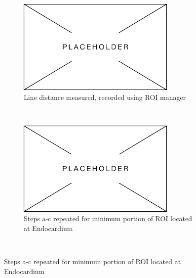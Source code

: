 \begin{figure}[H]
    \begin{subfigure}[c]{0.475\textwidth}
    \centering
    \includegraphics[width=1\linewidth]{Figures/Placeholder.png}
    \caption{Line distance measured, recorded using ROI manager}
    \end{subfigure}
    ~
    \begin{subfigure}[d]{0.475\textwidth}
    \centering
    \includegraphics[width=1\linewidth]{Figures/Placeholder.png}
    \caption{Steps a-c repeated for minimum portion of ROI located at Endocardium}
    \end{subfigure}
    \


\end{figure}
